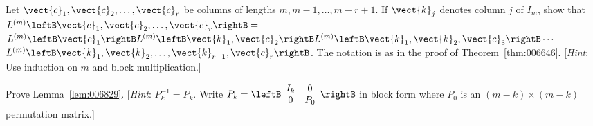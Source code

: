 \begin{multicols}{2}
\begin{ex}
\begin{sol}
\begin{enumerate}[label={\alph*.}]
\end{enumerate}
\end{sol}
\end{ex}

\begin{ex}
	Let $\vect{c}_{1}, \vect{c}_{2}, \dots, \vect{c}_{r}$ be columns of lengths $m, m - 1, \dots, m - r + 1$. If $\vect{k}_{j}$ denotes column $j$ of $I_{m}$, show that $L^{(m)} \leftB \vect{c}_{1}, \vect{c}_{2}, \dots, \vect{c}_{r} \rightB =$ $L^{(m)} \leftB \vect{c}_{1} \rightB L^{(m)} \leftB \vect{k}_{1}, \vect{c}_{2} \rightB L^{(m)} \leftB \vect{k}_{1}, \vect{k}_{2}, \vect{c}_{3} \rightB \cdots$ \\ $L^{(m)} \leftB \vect{k}_{1}, \vect{k}_{2}, \dots, \vect{k}_{r-1}, \vect{c}_{r} \rightB$. The notation is as in the proof of Theorem~\ref{thm:006646}. [\textit{Hint}: Use induction on $m$ and block multiplication.]
\end{ex}

\begin{ex}\label{ex:ex2_7_11}
Prove Lemma~\ref{lem:006829}. [\textit{Hint}: $P_{k}^{-1} = P_{k}$. Write $P_{k} = \leftB \begin{array}{cc}
I_{k} & 0 \\
0 & P_{0}
\end{array} \rightB$
 in block form where $P_{0}$ is an $(m - k) \times (m - k)$ permutation matrix.]
\end{ex}
\end{multicols}
